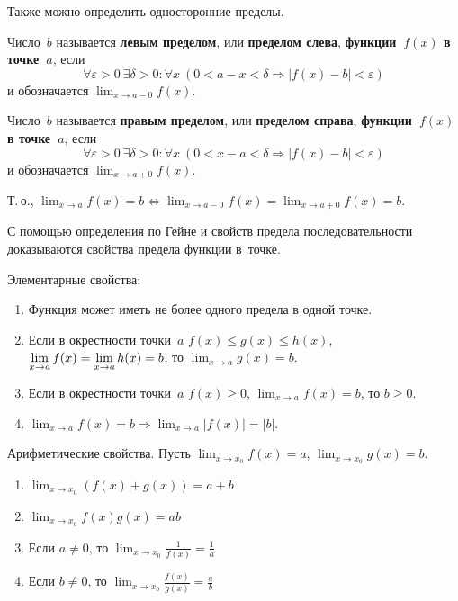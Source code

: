 Также можно определить односторонние пределы.

Число~$b$ называется \textbf{левым пределом}, или \textbf{пределом слева}, \textbf{функции~$f(x)$ в точке~$a$}, если
\begin{equation*}
\forall \varepsilon > 0 \ \exists \delta > 0 \colon \forall x \ (0 < a - x < \delta \Rightarrow |f(x) - b| < \varepsilon)
\end{equation*}
и обозначается $\displaystyle \lim_{x \to a-0} f(x)$.

Число~$b$ называется \textbf{правым пределом}, или \textbf{пределом справа}, \textbf{функции~$f(x)$ в точке~$a$}, если
\begin{equation*}
\forall \varepsilon > 0 \ \exists \delta > 0 \colon \forall x \ (0 < x - a < \delta \Rightarrow |f(x) - b| < \varepsilon)
\end{equation*}
и обозначается $\displaystyle \lim_{x \to a+0} f(x)$.

Т.\,о., $\displaystyle \lim_{x \to a} f(x) = b \Leftrightarrow \lim_{x \to a-0} f(x) = \lim_{x \to a+0} f(x) = b$.

С помощью определения по Гейне и свойств предела последовательности доказываются свойства предела функции в~точке.

Элементарные свойства:
\begin{enumerate}
	\item Функция может иметь не более одного предела в одной точке.
	\item \begin{theorem}
	\label{th:about_two_policemen}
	Если в окрестности точки~$a$ $f(x) \leqslant g(x) \leqslant h(x)$, $\displaystyle \lim_{x \to a} f(x) \opbr= \lim_{x \to a} h(x) \opbr= b$, то $\displaystyle \lim_{x \to a} g(x) = b$.
	\end{theorem}
	\item Если в окрестности точки~$a$ $f(x) \geqslant 0$, $\displaystyle \lim_{x \to a} f(x) = b$, то $b \geqslant 0$.
	\item $\displaystyle \lim_{x \to a} f(x) = b \Rightarrow \lim_{x \to a} |f(x)| = |b|$.
\end{enumerate}

Арифметические свойства.
Пусть $\displaystyle \lim_{x \to x_0} f(x) = a$, $\displaystyle \lim_{x \to x_0} g(x) = b$.
\begin{enumerate}
	\item $\displaystyle \lim_{x \to x_0} (f(x) + g(x)) = a + b$
	\item $\displaystyle \lim_{x \to x_0} f(x)g(x) = ab$
	\item Если $a \neq 0$, то $\displaystyle \lim_{x \to x_0} \frac1{f(x)} = \frac1a$
	\item Если $b \neq 0$, то $\displaystyle \lim_{x \to x_0} \frac{f(x)}{g(x)} = \frac{a}b$
\end{enumerate}